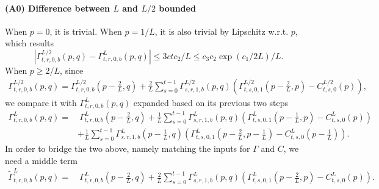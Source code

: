 \documentclass{article}
\theoremstyle{plain}
\theoremstyle{definition}
\begin{document}
\paragraph{(A0) Difference between $L$ and $L/2$ bounded}

When $p=0$, it is trivial.
When $p=1/L$, it is also trivial by Lipschitz w.r.t. $p$, which results  
\[|\Gamma_{t,r,0,b}^{L/2}\left(p, q\right) - \Gamma_{t,r,0,b}^{L}\left(p, q\right)|\leq 3ctc_2/L\leq c_3 c_2\exp(c_1/2L)/L.\]
When $p\geq 2/L$, since 
\begin{align*}
    \Gamma_{t,r,0,b}^{L/2}\left(p, q\right) = \Gamma_{t,r,0,b}^{L/2}\left(p-\frac2L, q\right) + \frac2L \sum_{s=0}^{t-1} \Gamma_{s,r,1,b}^{L/2}\left(p, q\right)\left(\Gamma_{t,s,0,1}^{L/2}\left(p-\frac2L, p\right)-C_{t,s,0}^{L/2}(p)\right),
\end{align*}
we compare it with $\Gamma_{t,r,0,b}^{L}\left(p, q\right)$ expanded based on its previous two steps
\begin{align*} 
     \Gamma^L_{t,r,0,b}\left(p, q\right) = &~\Gamma^L_{t,r,0,b}\left(p-\frac2L, q\right) + \frac1L \sum_{s=0}^{t-1} \Gamma^L_{s,r,1,b}\left(p, q\right)\left(\Gamma^L_{t,s,0,1}\left(p-\frac1L, p\right)-C^L_{t,s,0}\left(p\right)\right) \\
     & + \frac1L \sum_{s=0}^{t-1} \Gamma^L_{s,r,1,b}\left(p-\frac1L, q\right)\left(\Gamma^L_{t,s,0,1}\left(p-\frac2L, p-\frac1L\right)-C^L_{t,s,0}\left(p-\frac1L\right)\right).
\end{align*}
In order to bridge the two above, namely matching the inputs for $\Gamma$ and $C$, we need a middle term 
\begin{align*} 
    \tilde\Gamma^L_{t,r,0,b}\left(p, q\right) = &~\Gamma^L_{t,r,0,b}\left(p-\frac2L, q\right) + \frac2L \sum_{s=0}^{t-1} \Gamma^L_{s,r,1,b}\left(p, q\right)\left(\Gamma^L_{t,s,0,1}\left(p-\frac2L, p\right)-C^L_{t,s,0}\left(p\right)\right).
\end{align*}
\end{document}
